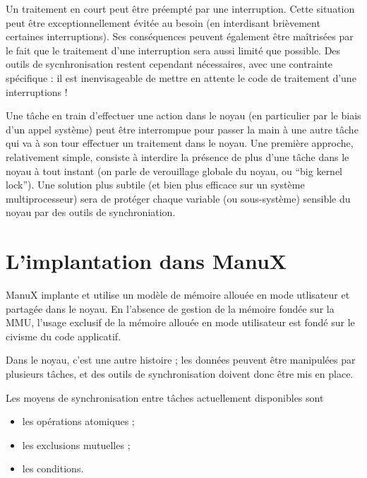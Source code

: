    Un traitement en court peut être préempté par une
   interruption. Cette situation peut être exceptionnellement évitée
   au besoin (en interdisant brièvement certaines interruptions). Ses
   conséquences peuvent également être maîtrisées par le fait que le
   traitement d'une interruption sera aussi limité que possible. Des
   outils de sycnhronisation restent cependant nécessaires, avec une
   contrainte spécifique : il est inenvisageable de mettre en attente
   le code de traitement d'une interruptions !

   Une tâche en train d'effectuer une action dans le noyau (en
   particulier par le biais d'un appel système) peut être interrompue
   pour passer la main à une autre tâche qui va à son tour effectuer
   un traitement dans le noyau. Une première approche, relativement
   simple, consiste à interdire la présence de plus d'une tâche dans
   le noyau à tout instant (on parle de verouillage globale du noyau,
   ou ``big kernel lock''). Une solution plus subtile (et bien plus
   efficace sur un système multiprocesseur) sera de protéger chaque
   variable (ou sous-système) sensible du noyau par des outils de
   synchroniation. 

\section{L'implantation dans ManuX}

   ManuX implante et utilise un modèle de mémoire allouée en mode
utlisateur et partagée dans le noyau. En l'absence de gestion de la
mémoire fondée sur la MMU, l'usage exclusif de la mémoire allouée en
mode utilisateur est fondé sur le civisme du code applicatif.

   Dans le noyau, c'est une autre histoire ; les données peuvent être
manipulées par plusieurs tâches, et des outils de synchronisation
doivent donc être mis en place.
   
   Les moyens de synchronisation entre tâches actuellement disponibles
sont 

\begin{itemize}
   \item les opérations atomiques ;
   \item les exclusions mutuelles ;
   \item les conditions.
\end{itemize}

